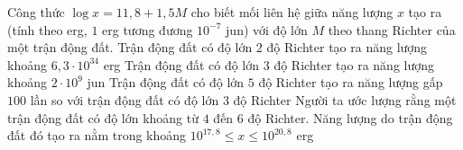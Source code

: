 \begin{ex}%
 Công thức $\log x=11{,}8+1{,}5M$ cho biết mối liên hệ giữa năng lượng $x$ tạo ra (tính theo erg,  $1$ erg tương đương $10^{-7}$ jun) với độ lớn $M$ theo thang Richter của một trận động đất.
 \choiceTF 
  {Trận động đất có độ lớn $2$  độ Richter tạo ra năng lượng khoảng $6{,}3\cdot 10^{34}$ erg}
  {\True Trận động đất có độ lớn $3$ độ  Richter tạo ra năng lượng khoảng $2\cdot 10^9$ jun}
  {Trận động đất có độ lớn $5$ độ Richter tạo ra năng lượng gấp $100$  lần so với trận động đất có độ lớn $3$ độ Richter}
  {\True Người ta ước lượng rằng  một trận động đất có độ lớn khoảng từ $4$ đến $6$ độ Richter. Năng lượng do trận động đất đó tạo ra nằm trong khoảng $10^{17{,}8} \le x\le 10^{20{,}8}$ erg}
\end{ex}



